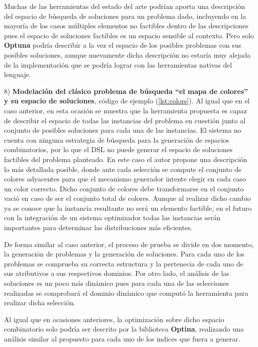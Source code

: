 Muchas de las herramientas del estado del arte podrían aporta una descripción del espacio de búsqueda de soluciones para un problema
dado, incluyendo en la mayoría de los casos múltiples elementos no factibles dentro de las descripciones pues el espacio de
soluciones factibles es un espacio sensible al contexto. Pero solo {\bf Optuna} podría describir a la vez el espacio de los posibles
problemas con sus posibles soluciones, aunque nuevamente dicha descripción no estaría muy alejada de la implementación que se podría
lograr con las herramientas nativas del lenguaje.

8) {\bf Modelación del clásico problema de búsqueda “el mapa de colores” y su espacio de soluciones}, código de ejemplo (\ref{lst:colors}). Al igual que en el caso anterior,
en esta ocasión se muestra que la herramienta propuesta es capaz de describir el espacio de todas las instancias del problema en
cuestión junto al conjunto de posibles soluciones para cada una de las instancias. El sistema no cuenta con ninguna estrategia de búsqueda 
para la generación de espacios combinatorios, por lo que el DSL no puede generar el espacio de soluciones factibles del problema planteado. 
En este caso el autor propone una descripción lo más detallada posible, donde ante cada selección se compute el conjunto de colores 
adyacentes para que el mecanismo generador intente elegir en cada caso un color correcto. Dicho conjunto de colores debe transformarse 
en el conjunto vació en caso de ser el conjunto total de colores. Aunque al realizar dicho cambio ya se conoce que la instancia resultante 
no será un elemento factible, en el futuro con la integración de un sistema optimizador todas las instancias serán importantes para 
determinar las distribuciones más eficientes.

De forma similar al caso anterior, el proceso de prueba se divide en dos momento, la generación de problemas y la generación de
soluciones. Para cada uno de los problemas se comprueba su correcta estructura y la pertenecia de cada uno de sus atributivos a sus
respectivos dominios. Por otro lado, el análisis de las soluciones es un poco más dinámico pues para cada una de las selecciones
realizadas se comprobará el dominio dinámico que computó la herramienta para realizar dicha selección.

Al igual que en ocasiones anteriores, la optimización sobre dicho espacio combinatorio solo podría ser descrito por la biblioteca
      {\bf Optina}, realizando una análisis similar al propuesto para cada uno de los indices que fuera a generar.

